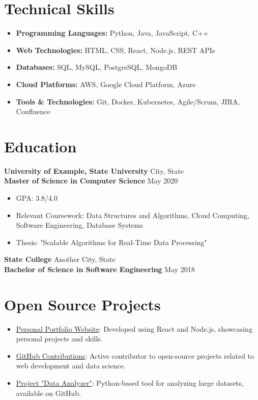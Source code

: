 \documentclass[a4paper,10pt]{article}
\begin{document}
\section*{Technical Skills}
\begin{itemize}
    \item \textbf{Programming Languages:} Python, Java, JavaScript, C++
    \item \textbf{Web Technologies:} HTML, CSS, React, Node.js, REST APIs
    \item \textbf{Databases:} SQL, MySQL, PostgreSQL, MongoDB
    \item \textbf{Cloud Platforms:} AWS, Google Cloud Platform, Azure
    \item \textbf{Tools \& Technologies:} Git, Docker, Kubernetes, Agile/Scrum, JIRA, Confluence
\end{itemize}

\section*{Education}

\textbf{University of Example, State University} \hfill City, State \\
\textbf{Master of Science in Computer Science} \hfill May 2020
\begin{itemize}
    \item GPA: 3.8/4.0
    \item Relevant Coursework: Data Structures and Algorithms, Cloud Computing, Software Engineering, Database Systems    \item Thesis: "Scalable Algorithms for Real-Time Data Processing"
\end{itemize}

\textbf{State College} \hfill Another City, State \\
\textbf{Bachelor of Science in Software Engineering} \hfill May 2018

\section*{Open Source Projects}
\begin{itemize}
    \item \href{https://example-portfolio.com}{Personal Portfolio Website}: Developed using React and Node.js, showcasing personal projects and skills.
    \item \href{https://github.com/johndoe-github}{GitHub Contributions}: Active contributor to open-source projects related to web development and data science.
    \item \href{https://github.com/project-repo}{Project "Data Analyzer"}: Python-based tool for analyzing large datasets, available on GitHub.
\end{itemize}
\end{document}
